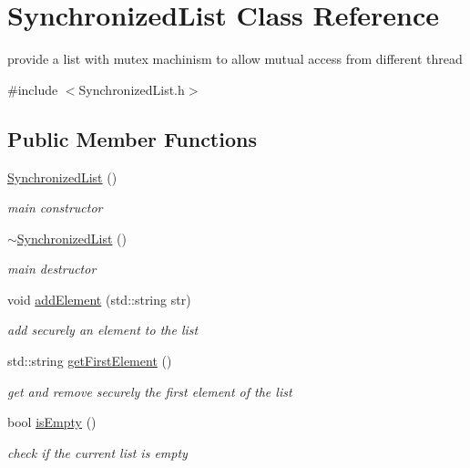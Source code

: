 \hypertarget{class_synchronized_list}{\section{Synchronized\-List Class Reference}
\label{class_synchronized_list}
}


provide a list with mutex machinism to allow mutual access from different thread  




{\ttfamily \#include $<$Synchronized\-List.\-h$>$}

\subsection*{Public Member Functions}
\begin{DoxyCompactItemize}
\item 
\hypertarget{class_synchronized_list_a4d431ece7d5172c6c57a6987959c7a7a}{\hyperlink{class_synchronized_list_a4d431ece7d5172c6c57a6987959c7a7a}{Synchronized\-List} ()}\label{class_synchronized_list_a4d431ece7d5172c6c57a6987959c7a7a}

\begin{DoxyCompactList}\small\item\em main constructor \end{DoxyCompactList}\item 
\hypertarget{class_synchronized_list_a98c56ce4918c800f0797d25b7babd9c9}{\hyperlink{class_synchronized_list_a98c56ce4918c800f0797d25b7babd9c9}{$\sim$\-Synchronized\-List} ()}\label{class_synchronized_list_a98c56ce4918c800f0797d25b7babd9c9}

\begin{DoxyCompactList}\small\item\em main destructor \end{DoxyCompactList}\item 
void \hyperlink{class_synchronized_list_a3692cd14b2b0b87e3f0a7fda2c60146e}{add\-Element} (std\-::string str)
\begin{DoxyCompactList}\small\item\em add securely an element to the list \end{DoxyCompactList}\item 
std\-::string \hyperlink{class_synchronized_list_aaa6cca1aca8b521122220fa663e739bf}{get\-First\-Element} ()
\begin{DoxyCompactList}\small\item\em get and remove securely the first element of the list \end{DoxyCompactList}\item 
bool \hyperlink{class_synchronized_list_a9f53b9e155f7aa66aa437b096fbd89ea}{is\-Empty} ()
\begin{DoxyCompactList}\small\item\em check if the current list is empty \end{DoxyCompactList}\end{DoxyCompactItemize}
